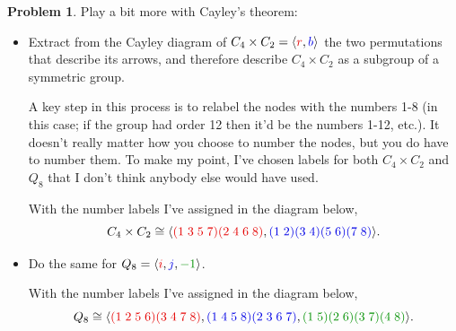 \documentclass[12pt]{article}
\theoremstyle{definition} %
\newtheorem{problem}{Problem}
\newcommand{\Alert}[1]{\textcolor{xRed}{#1}}
\newcommand{\Balert}[1]{\textcolor{xBlue}{#1}}
\newcommand{\Galert}[1]{\textcolor{xGreen}{#1}}
\def\<{\langle}
\def\>{\rangle}
\newenvironment{red}{\color{red}}{\ignorespacesafterend}
\begin{document}
\begin{problem}
    Play a bit more with Cayley's theorem:
    \begin{itemize}
        \item Extract from the Cayley diagram of $C_4\times C_2 = \< \Alert{r}, \Balert{b} \>$ the two permutations that describe its arrows, and therefore describe $C_4 \times C_2$ as a subgroup of a symmetric group.

        \begin{red}
            A key step in this process is to relabel the nodes with the numbers 1-8 (in this case; if the group had order 12 then it'd be the numbers 1-12, etc.). It doesn't really matter how you choose to number the nodes, but you do have to number them. To make my point, I've chosen labels for both $C_4 \times C_2$ and $Q_8$ that I don't think anybody else would have used.
        \end{red}

        {\color{red} With the number labels I've assigned in the diagram below,} 
        \[C_4 \times C_2 \cong \<\Alert{(1\;3\;5\;7)(2\;4\;6\;8)}, \Balert{(1\;2)(3\;4)(5\;6)(7\;8)}\>.\]
        
        \item Do the same for $Q_8 = \< \Alert{i}, \Balert{j}, \Galert{-1} \>$.

        {\color{red} With the number labels I've assigned in the diagram below,} 
        \[Q_8 \cong \<\Alert{(1\;2\;5\;6)(3\;4\;7\;8)}, \Balert{(1\;4\;5\;8)(2\;3\;6\;7)}, \Galert{(1\;5)(2\;6)(3\;7)(4\;8)}\>.\]


\end{itemize}
\end{problem}
\end{document}
